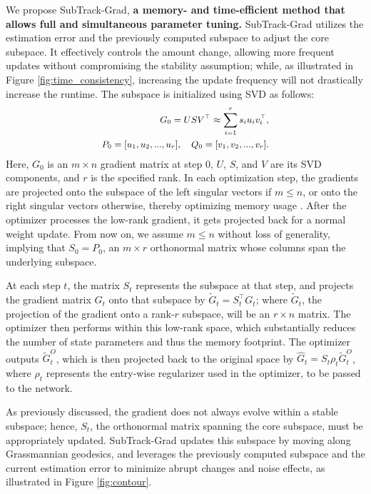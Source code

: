 We propose SubTrack-Grad, {\bf a memory- and time-efficient method that allows full and simultaneous parameter tuning.} SubTrack-Grad utilizes the estimation error and the previously computed subspace to adjust the core subspace. It effectively controls the amount change, allowing more frequent updates without compromising the stability assumption; while, as illustrated in Figure \ref{fig:time_consistency}, increasing the update frequency will not drastically increase the runtime. The subspace is initialized using SVD as follows:
\begin{equation}
\small
\begin{split}
    \label{eq:svd_p_q}
    G_0 = U S V^{\top} \approx \sum_{i=1}^{r} s_{i} u_{i} v_{i}^{\top},  \\
    P_0 = [u_1, u_2, ..., u_r], 
    \quad
    Q_0 = [v_1, v_2, ..., v_r].
\end{split}
\end{equation}
Here, \(G_0\) is an \(m \times n\) gradient matrix at step \(0\), \(U\), \(S\), and \(V\) are its SVD components, and \(r\) is the specified rank. In each optimization step, the gradients are projected onto the subspace of the left singular vectors if \(m \leq n\), or onto the right singular vectors otherwise, thereby optimizing memory usage \citep{zhao2024galorememoryefficientllmtraining}. After the optimizer processes the low-rank gradient, it gets projected back for a normal weight update. From now on, we assume \(m \leq n\) without loss of generality, implying that \(S_0 = P_0\), an \(m \times r\) orthonormal matrix whose columns span the underlying subspace.

At each step \(t\), the matrix \(S_t\) represents the subspace at that step, and projects the gradient matrix \(G_t\) onto that subspace by \(\widetilde{G}_t = S_t^\top G_t\); where \(\widetilde{G}_t\), the projection of the gradient onto a rank-\(r\) subspace, will be an \(r \times n\) matrix. The optimizer then performs within this low-rank space, which substantially reduces the number of state parameters and thus the memory footprint. The optimizer outputs \(\widetilde{G}_t^O\), which is then projected back to the original space by \(\widehat{G}_t = S_t \rho_t \widetilde{G}_t^O\), where \( \rho_t \) represents the entry-wise regularizer used in the optimizer, to be passed to the network.

As previously discussed, the gradient does not always evolve within a stable subspace; hence, \(S_t\), the orthonormal matrix spanning the core subspace, must be appropriately updated. SubTrack-Grad updates this subspace by moving along Grassmannian geodesics, and leverages the previously computed subspace and the current estimation error to minimize abrupt changes and noise effects, as illustrated in Figure \ref{fig:contour}.

